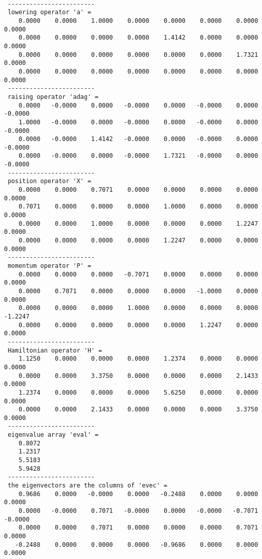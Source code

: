 \documentclass[12pt]{article}
\begin{document}
\begin{lstlisting}[frame=single,caption={Output of {\tt Fortran 90} Code {\tt hrmosc.f90} with {\tt ndim} = 4, {\tt Mass} = 2, and {\tt Omega} = $\sqrt{2}$},label=out2]

 ------------------------
 lowering operator 'a' =
    0.0000    0.0000    1.0000    0.0000    0.0000    0.0000    0.0000    0.0000
    0.0000    0.0000    0.0000    0.0000    1.4142    0.0000    0.0000    0.0000
    0.0000    0.0000    0.0000    0.0000    0.0000    0.0000    1.7321    0.0000
    0.0000    0.0000    0.0000    0.0000    0.0000    0.0000    0.0000    0.0000
 ------------------------
 raising operator 'adag' =
    0.0000   -0.0000    0.0000   -0.0000    0.0000   -0.0000    0.0000   -0.0000
    1.0000   -0.0000    0.0000   -0.0000    0.0000   -0.0000    0.0000   -0.0000
    0.0000   -0.0000    1.4142   -0.0000    0.0000   -0.0000    0.0000   -0.0000
    0.0000   -0.0000    0.0000   -0.0000    1.7321   -0.0000    0.0000   -0.0000
 ------------------------
 position operator 'X' =
    0.0000    0.0000    0.7071    0.0000    0.0000    0.0000    0.0000    0.0000
    0.7071    0.0000    0.0000    0.0000    1.0000    0.0000    0.0000    0.0000
    0.0000    0.0000    1.0000    0.0000    0.0000    0.0000    1.2247    0.0000
    0.0000    0.0000    0.0000    0.0000    1.2247    0.0000    0.0000    0.0000
 ------------------------
 momentum operator 'P' =
    0.0000    0.0000    0.0000   -0.7071    0.0000    0.0000    0.0000    0.0000
    0.0000    0.7071    0.0000    0.0000    0.0000   -1.0000    0.0000    0.0000
    0.0000    0.0000    0.0000    1.0000    0.0000    0.0000    0.0000   -1.2247
    0.0000    0.0000    0.0000    0.0000    0.0000    1.2247    0.0000    0.0000
 ------------------------
 Hamiltonian operator 'H' =
    1.1250    0.0000    0.0000    0.0000    1.2374    0.0000    0.0000    0.0000
    0.0000    0.0000    3.3750    0.0000    0.0000    0.0000    2.1433    0.0000
    1.2374    0.0000    0.0000    0.0000    5.6250    0.0000    0.0000    0.0000
    0.0000    0.0000    2.1433    0.0000    0.0000    0.0000    3.3750    0.0000
 ------------------------
 eigenvalue array 'eval' =
    0.8072
    1.2317
    5.5183
    5.9428
 ------------------------
 the eigenvectors are the columns of 'evec' =
    0.9686    0.0000   -0.0000    0.0000   -0.2488    0.0000    0.0000    0.0000
    0.0000   -0.0000    0.7071   -0.0000    0.0000   -0.0000   -0.7071   -0.0000
    0.0000    0.0000    0.7071    0.0000    0.0000    0.0000    0.7071    0.0000
   -0.2488    0.0000    0.0000    0.0000   -0.9686    0.0000    0.0000    0.0000

\end{lstlisting}
\end{document}

